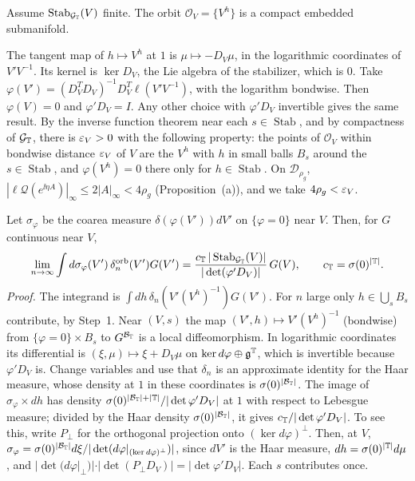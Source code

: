 \begin{detail}\label{d11a:E5}
Assume $\operatorname{Stab}_{\mathcal G_\mathbb T}(V)$ finite. The orbit $\mathcal O_V=\{V^h\}$ is a compact embedded submanifold.
\begin{step}
The tangent map of $h\mapsto V^h$ at $1$ is $\mu\mapsto-D_V\mu$, in the logarithmic coordinates of $V'V^{-1}$. Its kernel is $\ker D_V$, the Lie algebra of the stabilizer, which is $0$. Take $\varphi(V')=(D_V^TD_V)^{-1}D_V^T\ell(V'V^{-1})$, with the logarithm bondwise. Then $\varphi(V)=0$ and $\varphi'D_V=I$. Any other choice with $\varphi'D_V$ invertible gives the same result. By the inverse function theorem near each $s\in\operatorname{Stab}$, and by compactness of $\mathcal G_\mathbb T$, there is $\varepsilon_V>0$ with the following property: the points of $\mathcal O_V$ within bondwise distance $\varepsilon_V$ of $V$ are the $V^h$ with $h$ in small balls $B_s$ around the $s\in\operatorname{Stab}$, and $\varphi(V^h)=0$ there only for $h\in\operatorname{Stab}$. On $\mathcal D_{\rho_g}$, $|\ell\mathcal Q(e^{\ii\eta A})|_\infty\le2|A|_\infty<4\rho_g$ (Proposition~(a)), and we take $4\rho_g<\varepsilon_V$.
\end{step}
\begin{step}
Let $\sigma_\varphi$ be the coarea measure $\delta(\varphi(V'))dV'$ on $\{\varphi=0\}$ near $V$. Then, for $G$ continuous near $V$,
\[
\lim_{n\to\infty}\int d\sigma_\varphi(V')\,\delta^{\rm orb}_n(V')G(V')=\frac{c_\mathbb T\,|\operatorname{Stab}_{\mathcal G_\mathbb T}(V)|}{|\det(\varphi'D_V)|}\,G(V),\qquad c_\mathbb T=\sigma(0)^{|\mathbb T|}.
\]
\emph{Proof.} The integrand is $\int dh\,\delta_n(V'(V^h)^{-1})G(V')$. For $n$ large only $h\in\bigcup_sB_s$ contribute, by Step~1. Near $(V,s)$ the map $(V',h)\mapsto V'(V^h)^{-1}$ (bondwise) from $\{\varphi=0\}\times B_s$ to $G^{\mathcal B_\mathbb T}$ is a local diffeomorphism. In logarithmic coordinates its differential is $(\xi,\mu)\mapsto\xi+D_V\mu$ on $\ker d\varphi\oplus\mathfrak g^\mathbb T$, which is invertible because $\varphi'D_V$ is. Change variables and use that $\delta_n$ is an approximate identity for the Haar measure, whose density at $1$ in these coordinates is $\sigma(0)^{|\mathcal B_\mathbb T|}$. The image of $\sigma_\varphi\times dh$ has density $\sigma(0)^{|\mathcal B_\mathbb T|+|\mathbb T|}/|\det\varphi'D_V|$ at $1$ with respect to Lebesgue measure; divided by the Haar density $\sigma(0)^{|\mathcal B_\mathbb T|}$, it gives $c_\mathbb T/|\det\varphi'D_V|$. To see this, write $P_\perp$ for the orthogonal projection onto $(\ker d\varphi)^\perp$. Then, at $V$, $\sigma_\varphi=\sigma(0)^{|\mathcal B_\mathbb T|}d\xi/|\det(d\varphi|_{(\ker d\varphi)^\perp})|$, since $dV'$ is the Haar measure, $dh=\sigma(0)^{|\mathbb T|}d\mu$, and $|\det(d\varphi|_\perp)|\cdot|\det(P_\perp D_V)|=|\det\varphi'D_V|$. Each $s$ contributes once.

\end{step}
\end{detail}
